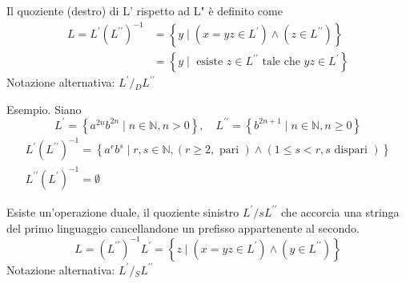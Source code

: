 Il quoziente (destro) di L' rispetto ad L" è definito come
$$
\begin{aligned}
L=L^{\prime}\left(L^{\prime \prime}\right)^{-1} &=\left\{y \mid\left(x=y z \in L^{\prime}\right) \wedge\left(z \in L^{\prime \prime}\right)\right\} \\
&=\left\{y \mid \text { esiste } z \in L^{\prime \prime} \text { tale che } y z \in L^{\prime}\right\}
\end{aligned}
$$
Notazione alternativa: $L^{\prime} /{ }_{D} L^{\prime \prime}$

Esempio. Siano
$$
L^{\prime}=\left\{a^{2 n} b^{2 n} \mid n \in \mathbb{N}, n>0\right\}, \quad L^{\prime \prime}=\left\{b^{2 n+1} \mid n \in \mathbb{N}, n \geq 0\right\}
$$
$$
\begin{gathered}
L^{\prime}\left(L^{\prime \prime}\right)^{-1}=\left\{a^{r} b^{s} \mid r, s \in \mathbb{N},(r \geq 2, \text { pari }) \wedge(1 \leq s<r, s \text { dispari })\right\} \\
L^{\prime \prime}\left(L^{\prime}\right)^{-1}=\emptyset
\end{gathered}
$$

Esiste un'operazione duale, il quoziente sinistro $L^{\prime} / s L^{\prime \prime}$ che accorcia una stringa del primo linguaggio cancellandone un prefisso appartenente al secondo.
$$
L=\left(L^{\prime \prime}\right)^{-1} L^{\prime}=\left\{z \mid\left(x=y z \in L^{\prime}\right) \wedge\left(y \in L^{\prime \prime}\right)\right\}
$$
Notazione alternativa: $L^{\prime} / { }_{S} L^{\prime \prime}$

\let\cleardoublepage\clearpage
